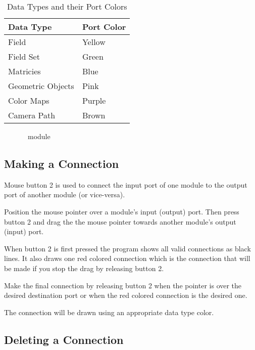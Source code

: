 \begin{table}[htbp]
  \begin{center}
    \begin{tabular}{|l|l|}
      \textbf{Data Type} & \textbf{Port Color} \\
      \hline
      Field & Yellow \\
      Field Set & Green \\
      Matricies & Blue \\
      Geometric Objects & Pink \\
      Color Maps & Purple \\
      Camera Path & Brown \\
      \hline
    \end{tabular}
    \caption{Data Types and their Port Colors}
    \label{tab:portcolors}
  \end{center}
\end{table}


\begin{figure}[htb]
  \begin{makeimage}
  \end{makeimage}
  \modgraphic
  \caption{\label{fig:module} \sr\ module}
\end{figure}


\subsection{Making a Connection}
\label{sec:connectmods}

Mouse button 2 is used to connect the input port of one module to
the output port of another module (or vice-versa).  

Position the mouse pointer over a module's input (output) port.  Then press
button 2 and drag the the mouse pointer towards another module's output (input)
port.   

When button 2 is first pressed the program shows all valid connections as
black lines.  It also draws one red colored connection which is the
connection that will be made if you stop the drag by releasing 
button 2.

Make the final connection by releasing button 2 when the pointer is over
the desired destination port or when the red colored connection is the
desired one.

The connection will be drawn using an appropriate data type color.

\subsection{Deleting a Connection}
\label{sec:deleteconnections}

